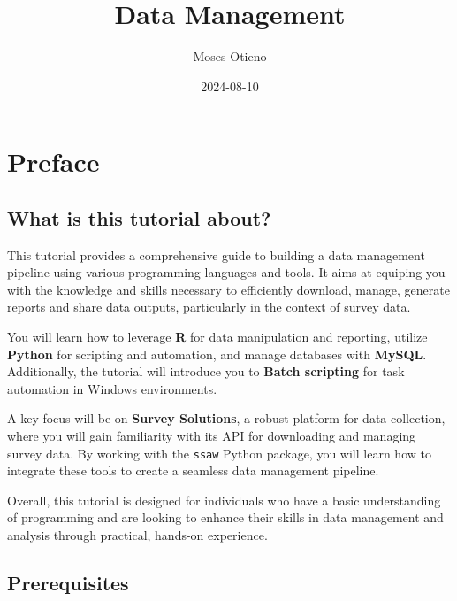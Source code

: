 \documentclass[
  letterpaper,
  DIV=11,
  numbers=noendperiod]{scrreprt}
\title{Data Management}
\author{Moses Otieno}
\date{2024-08-10}
\renewcommand*\contentsname{Table of contents}
\newcommand\contentsname{Table of contents}
\begin{document}
\maketitle

\renewcommand*\contentsname{Table of contents}
{
\hypersetup{linkcolor=}
\setcounter{tocdepth}{2}
\tableofcontents
}


\chapter*{Preface}\label{preface}


\section*{What is this tutorial
about?}\label{what-is-this-tutorial-about}


This tutorial provides a comprehensive guide to building a data
management pipeline using various programming languages and tools. It
aims at equiping you with the knowledge and skills necessary to
efficiently download, manage, generate reports and share data outputs,
particularly in the context of survey data.

You will learn how to leverage \textbf{R} for data manipulation and
reporting, utilize \textbf{Python} for scripting and automation, and
manage databases with \textbf{MySQL}. Additionally, the tutorial will
introduce you to \textbf{Batch scripting} for task automation in Windows
environments.

A key focus will be on \textbf{Survey Solutions}, a robust platform for
data collection, where you will gain familiarity with its API for
downloading and managing survey data. By working with the \texttt{ssaw}
Python package, you will learn how to integrate these tools to create a
seamless data management pipeline.

Overall, this tutorial is designed for individuals who have a basic
understanding of programming and are looking to enhance their skills in
data management and analysis through practical, hands-on experience.

\section*{Prerequisites}\label{prerequisites}
\end{document}
